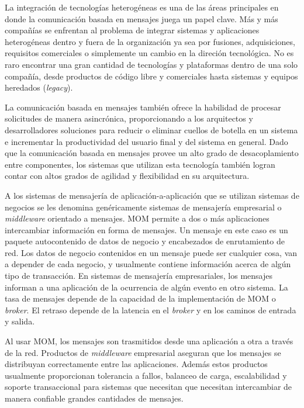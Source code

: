 \documentclass[conference]{IEEEtran}
\begin{document}
La integración de tecnologías heterogéneas es una de las áreas principales en donde la comunicación basada en mensajes juega un papel clave. Más y más compañías se enfrentan al problema de integrar sistemas y aplicaciones heterogéneas dentro y fuera de la organización ya sea por fusiones, adquisiciones, requisitos comerciales o simplemente un cambio en la direción tecnológica. No es raro encontrar una gran cantidad de tecnologías y plataformas dentro de una solo compañía, desde productos de código libre y comerciales hasta sistemas y equipos heredados (\emph{legacy}).

La comunicación basada en mensajes también ofrece la habilidad de procesar solicitudes de manera asincrónica, proporcionando a los arquitectos y desarrolladores soluciones para reducir o eliminar cuellos de botella en un sistema e incrementar la productividad del usuario final y del sistema en general. Dado que la comunicación basada en mensajes provee un alto grado de desacoplamiento entre componentes, los sistemas que utilizan esta tecnología también logran contar con altos grados de agilidad y flexibilidad en su arquitectura.

A los sistemas de mensajería de aplicación-a-aplicación que se utilizan sistemas de negocios se les denomina genéricamente sistemas de mensajería empresarial o \emph{middleware} orientado a mensajes\cite{jms20}. MOM permite a dos o más aplicaciones intercambiar información en forma de mensajes. Un mensaje en este caso es un paquete autocontenido de datos de negocio y encabezados de enrutamiento de red. Los datos de negocio contenidos en un mensaje puede ser cualquier cosa, van a depender de cada negocio, y usualmente contiene información acerca de algún tipo de transacción. En sistemas de mensajería empresariales, los mensajes informan a una aplicación de la ocurrencia de algún evento en otro sistema. La tasa de mensajes depende de la capacidad de la implementación de MOM o \emph{broker}. El retraso depende de la latencia en el \emph{broker} y en los caminos de entrada y salida\cite{chew}.

Al usar MOM, los mensajes son trasmitidos desde una aplicación a otra a través de la red. Productos de \emph{middleware} empresarial aseguran que los mensajes se distribuyan correctamente entre las aplicaciones. Además estos productos usualmente proporcionan tolerancia a fallos, balanceo de carga, escalabilidad y soporte transaccional para sistemas que necesitan que necesitan intercambiar de manera confiable grandes cantidades de mensajes.
\end{document}
